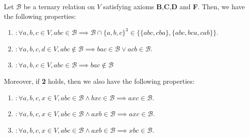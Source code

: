 \documentclass[10pt,a4paper]{amsart}
\newcommand{\calb}{\mathcal{B}}
\begin{document}
\begin{proposition}
\label{p:tools}
	Let $\calb$ be a ternary relation on $V$ satisfying axioms \textbf{B},\textbf{C},\textbf{D} and \textbf{F}. Then, we have the following properties:
    
	\begin{enumerate}
		\item[\textbf{L}\,] $: \forall a,b,c \in V, abc\in\calb\implies \calb\cap \{a,b,c\}^3\in \{ \{abc,cba\}, \{abc,bca,cab\} \}.$ 
        
		\item[\textbf{G}\,]$: \forall a,b,c,d \in V, abc\notin\calb\implies bac \in\calb\lor acb\in\calb.$
	        
	    \item[\textbf{C'}]$: \forall a,b,c \in V, abc\in\calb\implies bac\notin\calb$
	\end{enumerate}
	
	Moreover, if \textbf{2} holds, then we also have the following properties:
    
	\begin{enumerate}
		\item[\textbf{3}\ ]$: \forall a,b,c,x \in V, abc\in\calb\land bxc \in\calb\implies axc\in\calb$.
	    \item[\textbf{2'}]$: \forall a,b,c,x \in V, abc\in\calb\land axb \in\calb\implies axc\in\calb$.
	    \item[\textbf{3'}]$: \forall a,b,c,x \in V, abc\in\calb\land axb \in\calb\implies xbc\in\calb$.
            
            
	\end{enumerate}
\end{proposition}
\end{document}
